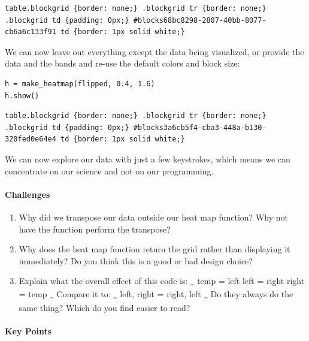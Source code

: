\documentclass[]{book}
\begin{document}
\begin{verbatim}
table.blockgrid {border: none;} .blockgrid tr {border: none;} .blockgrid td {padding: 0px;} #blocks68bc8298-2807-40bb-8077-cb6a6c133f91 td {border: 1px solid white;}
\end{verbatim}

We can now leave out everything except the data being visualized, or
provide the data and the bands and re-use the default colors and block
size:

\begin{verbatim}
h = make_heatmap(flipped, 0.4, 1.6)
h.show()
\end{verbatim}

\begin{verbatim}
table.blockgrid {border: none;} .blockgrid tr {border: none;} .blockgrid td {padding: 0px;} #blocks3a6cb5f4-cba3-448a-b130-320fed0e64e4 td {border: 1px solid white;}
\end{verbatim}

We can now explore our data with just a few keystrokes, which means we
can concentrate on our science and not on our programming.

\mbox{}\paragraph{Challenges}

\begin{enumerate}
\item
  Why did we transpose our data outside our heat map function? Why not
  have the function perform the transpose?
\item
  Why does the heat map function return the grid rather than displaying
  it immediately? Do you think this is a good or bad design choice?
\item
  Explain what the overall effect of this code is:
  \textsubscript{\textasciitilde{}} temp = left left = right right =
  temp \textsubscript{\textasciitilde{}} Compare it to:
  \textsubscript{\textasciitilde{}} left, right = right, left
  \textsubscript{\textasciitilde{}} Do they always do the same thing?
  Which do you find easier to read?
\end{enumerate}

\mbox{}\paragraph{Key Points}
\end{document}
